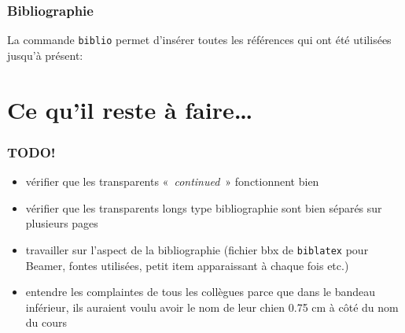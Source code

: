 \documentclass[fr,biblatex]{isae-slides}
\begin{document}
\begin{frame}
\frametitle{Bibliographie}

La commande \lstinline!biblio! permet d'insérer toutes les références
qui ont été utilisées jusqu'à présent:



\nocite{mittelbach04:_latex}
\biblio{}

\end{frame}

\section{Ce qu'il reste à faire\ldots}
\label{sec:todo}

\begin{frame}
\frametitle{TODO!}

\begin{itemize}
\item vérifier que les transparents «~\textit{continued}~»
  fonctionnent bien
\item vérifier que les transparents longs type bibliographie sont bien
  séparés sur plusieurs pages
\item travailler sur l'aspect de la bibliographie (fichier bbx de
  \texttt{biblatex} pour Beamer, fontes utilisées, petit item
  apparaissant à chaque fois etc.)
\item entendre les complaintes de tous les collègues parce que dans le
  bandeau inférieur, ils auraient voulu avoir le nom de leur chien
  0.75 cm à côté du nom du cours \smiley

\end{itemize}

\end{frame}
\end{document}
